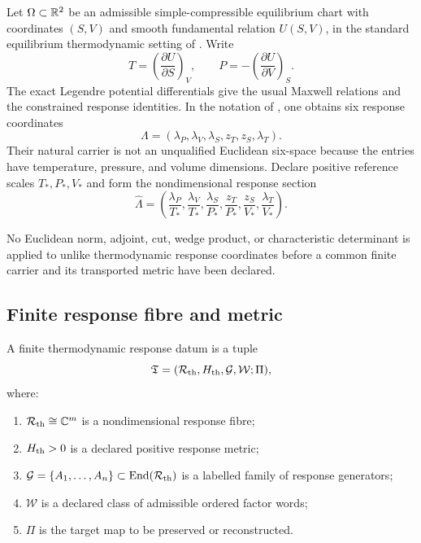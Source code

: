 Let $\Omega\subset\mathbb R^2$ be an admissible simple-compressible equilibrium chart with coordinates $(S,V)$ and smooth fundamental relation $U(S,V)$, in the standard equilibrium thermodynamic setting of \cite{callen1985,degroot1962}. Write
\[
 T=\left(\frac{\partial U}{\partial S}\right)_V,
 \qquad
 P=-\left(\frac{\partial U}{\partial V}\right)_S.
\]
The exact Legendre potential differentials give the usual Maxwell relations and the constrained response identities. In the notation of \cite{dabasThermoRecognition}, one obtains six response coordinates
\[
 \Lambda=(\lambda_P,\lambda_V,\lambda_S,z_T,z_S,\lambda_T).
\]
Their natural carrier is not an unqualified Euclidean six-space because the entries have temperature, pressure, and volume dimensions. Declare positive reference scales $T_*,P_*,V_*$ and form the nondimensional response section
\[
 \widehat\Lambda=
 \left(
 \frac{\lambda_P}{T_*},
 \frac{\lambda_V}{T_*},
 \frac{\lambda_S}{P_*},
 \frac{z_T}{P_*},
 \frac{z_S}{V_*},
 \frac{\lambda_T}{V_*}
 \right).
\]

\begin{principle}
No Euclidean norm, adjoint, cut, wedge product, or characteristic determinant is applied to unlike thermodynamic response coordinates before a common finite carrier and its transported metric have been declared.
\end{principle}

\subsection{Finite response fibre and metric}

\begin{definition}
A finite thermodynamic response datum is a tuple
\[
 \mathfrak T=(\mathcal R_{\mathrm{th}},H_{\mathrm{th}},\mathcal G,\mathcal W;\Pi),
\]
where:
\begin{enumerate}[label=(\roman*)]
\item $\mathcal R_{\mathrm{th}}\cong\mathbb C^m$ is a nondimensional response fibre;
\item $H_{\mathrm{th}}>0$ is a declared positive response metric;
\item $\mathcal G=\{A_1,\ldots,A_n\}\subset\operatorname{End}(\mathcal R_{\mathrm{th}})$ is a labelled family of response generators;
\item $\mathcal W$ is a declared class of admissible ordered factor words;
\item $\Pi$ is the target map to be preserved or reconstructed.
\end{enumerate}
\end{definition}

